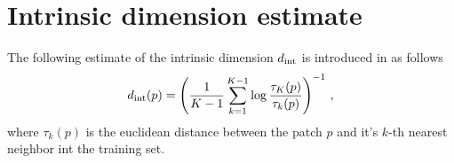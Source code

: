 \documentclass{article} %
\begin{document}
\section{Intrinsic dimension estimate}

The following estimate of the intrinsic dimension $d_{\rm int}$ is introduced in \cite{Levina:2004} as follows
\begin{align}
	d_{\rm int}(p) = \left( \frac{1}{K-1} \sum_{k=1}^{K-1}\log \frac{\tau_K(p)}{\tau_k(p)} \right)^{-1} \, ,
\end{align}
where $\tau_k(p)$ is the euclidean distance between the patch $p$ and it's $k$-th nearest neighbor int  the training set.
\end{document}

